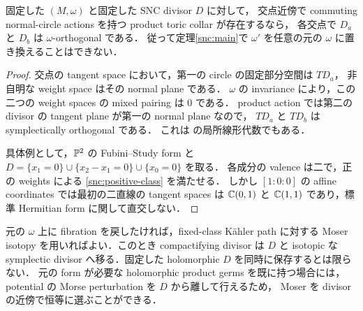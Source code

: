 \begin{proposition}
\label{snc:orthogonality}
固定した $(M,\omega)$ と固定した SNC divisor $D$ に対して，
交点近傍で commuting normal-circle actions を持つ product toric collar が存在するなら，
各交点で $D_a$ と $D_b$ は $\omega$-orthogonal である．
従って定理\ref{snc:main}で $\omega'$ を任意の元の $\omega$ に置き換えることはできない．
\end{proposition}
\begin{proof}
交点の tangent space において，第一の circle の固定部分空間は $TD_a$，
非自明な weight space はその normal plane である．
$\omega$ の invariance により，この二つの weight spaces の mixed pairing は $0$ である．
product action では第二の divisor の tangent plane が第一の normal plane なので，
$TD_a$ と $TD_b$ は symplectically orthogonal である．
これは \cite[Proposition 2.5]{BSV} の局所線形代数でもある．

具体例として，$\mathbb P^2$ の Fubini--Study form と
$D=\{x_1=0\}\cup\{x_2-x_1=0\}\cup\{x_0=0\}$ を取る．
各成分の valence は二で，正の weights による \eqref{snc:positive-class} を満たせる．
しかし $[1:0:0]$ の affine coordinates では最初の二直線の tangent spaces は
$\mathbb C(0,1)$ と $\mathbb C(1,1)$ であり，標準 Hermitian form に関して直交しない．
\end{proof}

元の $\omega$ 上に fibration を戻したければ，fixed-class Kähler path に対する
Moser isotopy を用いればよい．このとき compactifying divisor は $D$ と isotopic な
symplectic divisor へ移る．固定した holomorphic $D$ を同時に保存するとは限らない．
元の form が必要な holomorphic product germs を既に持つ場合には，
potential の Morse perturbation を $D$ から離して行えるため，
Moser を divisor の近傍で恒等に選ぶことができる．

